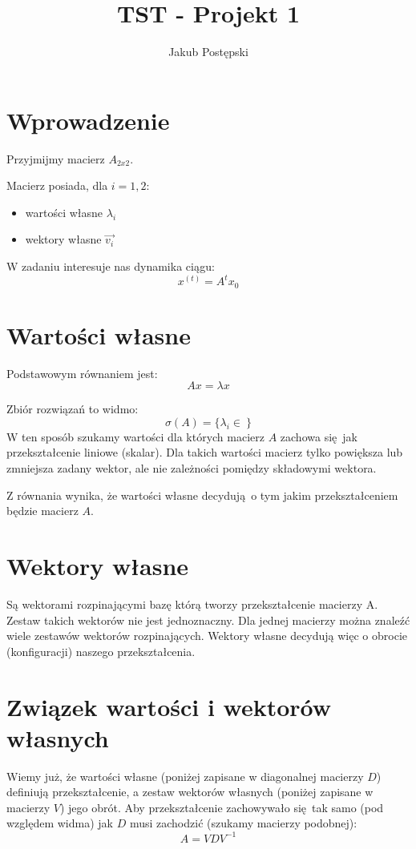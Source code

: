 \documentclass[]{article}
\title{TST - Projekt 1}
\author{Jakub Postępski}
\begin{document}
\maketitle


\section{Wprowadzenie}
Przyjmijmy macierz $A_{2x2}$.

Macierz posiada, dla $i = {1, 2}$:
\begin{itemize}
	\item wartości własne $\lambda_i$
	\item wektory własne $\vec{v_i}$ 
\end{itemize}

W zadaniu interesuje nas dynamika ciągu:
\[x^{(t)} = A^tx_0 \]

\section{Wartości własne}

Podstawowym równaniem jest:
\[ Ax = \lambda x\]

Zbiór rozwiązań to widmo: \[\sigma(A) = \{ \lambda_i \in \  \} \]
W ten sposób szukamy wartości dla których macierz $A$ zachowa się jak przekształcenie liniowe (skalar). Dla takich wartości macierz tylko powiększa lub zmniejsza zadany wektor, ale nie zależności pomiędzy składowymi wektora. 

Z równania wynika, że wartości własne decydują o tym jakim przekształceniem będzie macierz $A$.

\section{Wektory własne}
Są wektorami rozpinającymi bazę którą tworzy przekształcenie macierzy A. Zestaw takich wektorów nie jest jednoznaczny. Dla jednej macierzy można znaleźć wiele zestawów wektorów rozpinających. Wektory własne decydują więc o obrocie (konfiguracji) naszego przekształcenia. 

\section{Związek wartości i wektorów własnych}
Wiemy już, że wartości własne (poniżej zapisane w diagonalnej macierzy $D$) definiują przekształcenie, a zestaw wektorów własnych (poniżej zapisane w macierzy $V$) jego obrót. Aby przekształcenie zachowywało się tak samo (pod względem widma) jak $D$ musi zachodzić (szukamy macierzy podobnej):
\[A = VDV^{-1}\]
\end{document}
